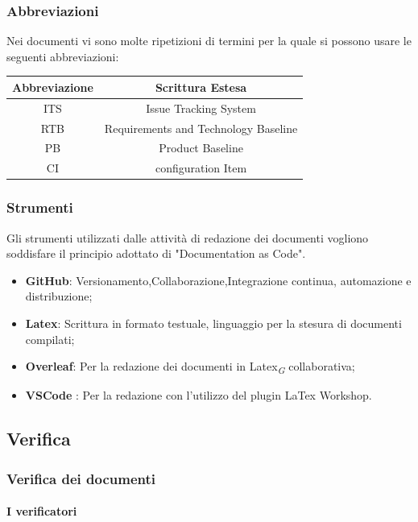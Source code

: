 \documentclass{article}
\begin{document}
    \subsubsection{Abbreviazioni}
    Nei documenti vi sono molte ripetizioni di termini per la quale si possono usare le seguenti abbreviazioni:\\
    \vspace{0.2cm}
    \begin{tabular}{|c|c|}
  \hline
  \textbf{Abbreviazione} & \textbf{Scrittura Estesa} \\
  \hline
  ITS & Issue Tracking System \\
  RTB & Requirements and Technology Baseline  \\
  PB & Product Baseline\\
  CI & configuration Item \\
  \hline
\end{tabular}

\subsubsection{Strumenti}
    Gli strumenti utilizzati dalle attività di redazione dei documenti vogliono soddisfare il principio adottato di "Documentation as Code".
    \begin{itemize}
        \item \textbf{GitHub}: Versionamento,Collaborazione,Integrazione continua, automazione e distribuzione;
        \item \textbf{Latex}: Scrittura in formato testuale, linguaggio per la stesura di documenti compilati;
        \item \textbf{Overleaf}: Per la redazione dei documenti in Latex\textsubscript{\textit{G}} collaborativa;
        \item \textbf{VSCode} : Per la redazione con l'utilizzo del plugin LaTex Workshop.
    \end{itemize}

\subsection{Verifica}\label{sec:verifica}
\subsubsection{Verifica dei documenti}
\paragraph{I verificatori}\label{sec:verificatori}
\end{document}
